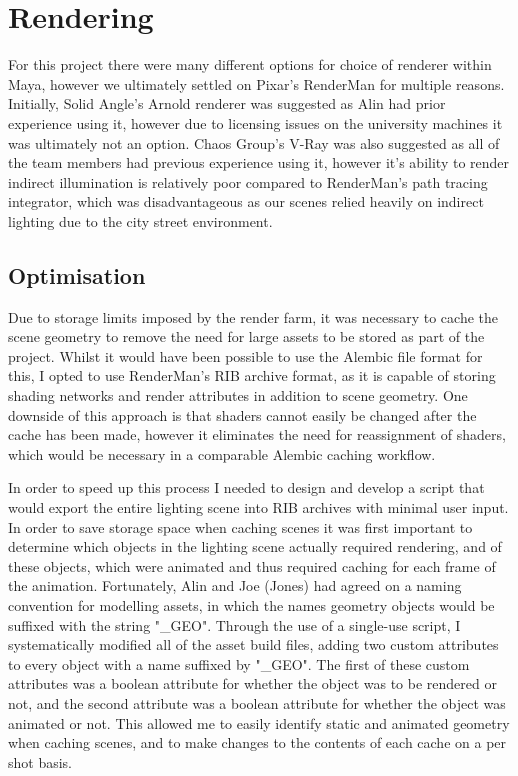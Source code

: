 \documentclass[11pt]{article}
\begin{document}
\section{Rendering}

For this project there were many different options for choice of renderer within Maya, however we ultimately settled on Pixar's RenderMan for multiple reasons. Initially, Solid Angle's Arnold renderer was suggested as Alin had prior experience using it, however due to licensing issues on the university machines it was ultimately not an option. Chaos Group's V-Ray was also suggested as all of the team members had previous experience using it, however it's ability to render indirect illumination is relatively poor compared to RenderMan's path tracing integrator, which was disadvantageous as our scenes relied heavily on indirect lighting due to the city street environment.

\subsection{Optimisation} \label{rlslgt}

Due to storage limits imposed by the render farm, it was necessary to cache the scene geometry to remove the need for large assets to be stored as part of the project. Whilst it would have been possible to use the Alembic file format for this, I opted to use RenderMan's RIB archive format, as it is capable of storing shading networks and render attributes in addition to scene geometry. One downside of this approach is that shaders cannot easily be changed after the cache has been made, however it eliminates the need for reassignment of shaders, which would be necessary in a comparable Alembic caching workflow.

In order to speed up this process I needed to design and develop a script that would export the entire lighting scene into RIB archives with minimal user input. In order to save storage space when caching scenes it was first important to determine which objects in the lighting scene actually required rendering, and of these objects, which were animated and thus required caching for each frame of the animation. Fortunately, Alin and Joe (Jones) had agreed on a naming convention for modelling assets, in which the names geometry objects would be suffixed with the string "\_GEO". Through the use of a single-use script, I systematically modified all of the asset build files, adding two custom attributes to every object with a name suffixed by "\_GEO". The first of these custom attributes was a boolean attribute for whether the object was to be rendered or not, and the second attribute was a boolean attribute for whether the object was animated or not. This allowed me to easily identify static and animated geometry when caching scenes, and to make changes to the contents of each cache on a per shot basis.
\end{document}
